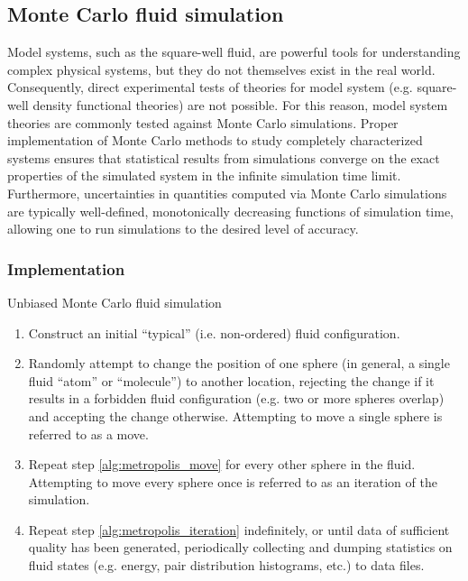 \documentclass[11pt]{article}
\newenvironment{alg}
{\hrulefill\begin{enumerate}}
{\end{enumerate}\hrulefill}
\begin{document}
\subsection{Monte Carlo fluid simulation}
\label{sec:monte_carlo}

Model systems, such as the square-well fluid, are powerful tools for
understanding complex physical systems, but they do not themselves
exist in the real world. Consequently, direct experimental tests of
theories for model system (e.g. square-well density functional
theories) are not possible. For this reason, model system theories are
commonly tested against Monte Carlo simulations. Proper implementation
of Monte Carlo methods to study completely characterized systems
ensures that statistical results from simulations converge on the
exact properties of the simulated system in the infinite simulation
time limit. Furthermore, uncertainties in quantities computed via
Monte Carlo simulations are typically well-defined, monotonically
decreasing functions of simulation time, allowing one to run
simulations to the desired level of accuracy.

\subsubsection{Implementation}
\label{sec:mc_implementation}

\begin{algorithm}[!b]
  \caption{Unbiased Monte Carlo fluid simulation}
  \label{alg:metropolis}
  \begin{alg}

  \item Construct an initial ``typical'' (i.e. non-ordered) fluid
    configuration.

  \item Randomly attempt to change the position of one sphere (in
    general, a single fluid ``atom'' or ``molecule'') to another
    location, rejecting the change if it results in a forbidden fluid
    configuration (e.g. two or more spheres overlap) and accepting the
    change otherwise. Attempting to move a single sphere is referred
    to as a move. \label{alg:metropolis_move}

  \item Repeat step \ref{alg:metropolis_move} for every other sphere
    in the fluid. Attempting to move every sphere once is referred to
    as an iteration of the simulation.
    \label{alg:metropolis_iteration}

  \item Repeat step \ref{alg:metropolis_iteration} indefinitely, or
    until data of sufficient quality has been generated, periodically
    collecting and dumping statistics on fluid states (e.g. energy,
    pair distribution histograms, etc.) to data files.

  \end{alg}
\end{algorithm}
\end{document}
